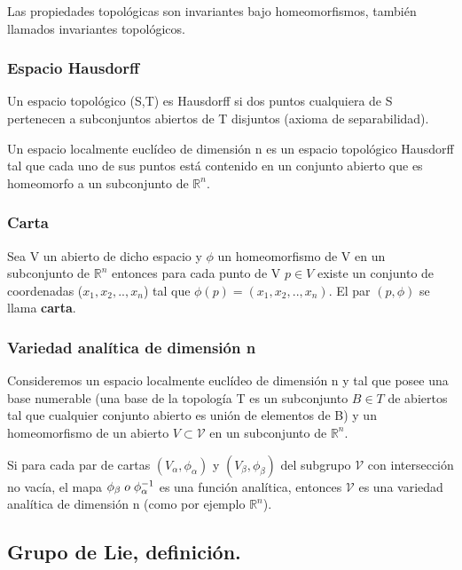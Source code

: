 \smallskip
Las propiedades topológicas son invariantes bajo homeomorfismos, también llamados invariantes topológicos.

\subsubsection{Espacio Hausdorff}

Un espacio topológico (S,T) es Hausdorff si dos puntos cualquiera de S pertenecen a subconjuntos abiertos de T disjuntos (axioma de separabilidad).

Un espacio localmente euclídeo de dimensión n es un espacio topológico Hausdorff tal que cada uno de sus puntos está contenido en un conjunto abierto que es homeomorfo a un subconjunto de $\mathds{R}^n$.


\subsubsection{Carta}
Sea V un abierto de dicho espacio y $\phi$ un homeomorfismo de V en un subconjunto de $\mathds{R}^n$ entonces para cada punto de V $p\in V$ existe un conjunto de coordenadas ($x_1,x_2,..,x_n$) tal que $\phi (p)= (x_1,x_2,..,x_n) $. El par $(p, \phi)$ se llama \textbf{carta}.

\subsubsection{Variedad analítica de dimensión n}

Consideremos un espacio localmente euclídeo de dimensión n y tal que posee una base numerable (una base de la topología T es un subconjunto $B \in T$ de abiertos tal que cualquier conjunto abierto es unión de elementos de B) y un homeomorfismo de un abierto $V \subset \mathcal{V}$ en un subconjunto de $\mathds{R}^n$.

\smallskip
Si para cada par de cartas $(V_\alpha , \phi _\alpha)$ y $(V_\beta , \phi _\beta)$ del subgrupo $\mathcal{V}$ con intersección no vacía, el mapa $\phi _\beta  \hspace{0.1cm} o \hspace{0.1cm} \phi _\alpha ^{-1}$ es una función analítica, entonces $\mathcal{V}$ es una variedad analítica de dimensión n (como por ejemplo $\mathds{R}^n$).

\subsection{Grupo de Lie, definición.}

